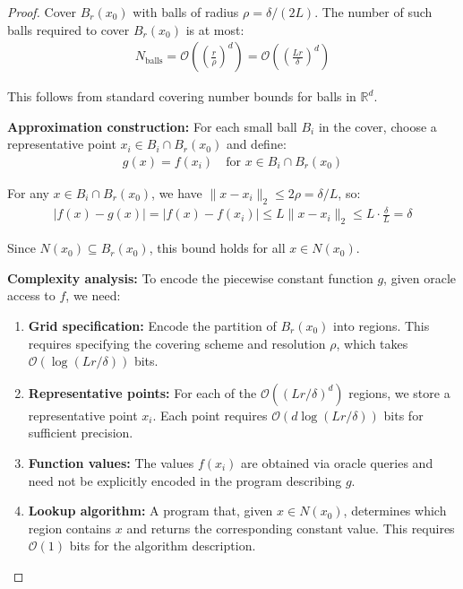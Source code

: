 \documentclass[10pt,a4paper]{amsart}
\begin{document}
\begin{proof}
Cover $B_r(x_0)$ with balls of radius $\rho = \delta/(2L)$. The number of such balls required to cover $B_r(x_0)$ is at most:
\begin{align}
N_{\text{balls}} = \mathcal{O}\left(\left(\frac{r}{\rho}\right)^d\right) = \mathcal{O}\left(\left(\frac{Lr}{\delta}\right)^d\right)
\end{align}

This follows from standard covering number bounds for balls in $\mathbb{R}^d$.

\textbf{Approximation construction:} For each small ball $B_i$ in the cover, choose a representative point $x_i \in B_i \cap B_r(x_0)$ and define:
\begin{align}
g(x) = f(x_i) \quad \text{for } x \in B_i \cap B_r(x_0)
\end{align}

For any $x \in B_i \cap B_r(x_0)$, we have $\|x - x_i\|_2 \leq 2\rho = \delta/L$, so:
\begin{align}
|f(x) - g(x)| = |f(x) - f(x_i)| \leq L\|x - x_i\|_2 \leq L \cdot \frac{\delta}{L} = \delta
\end{align}

Since $N(x_0) \subseteq B_r(x_0)$, this bound holds for all $x \in N(x_0)$.

\textbf{Complexity analysis:} To encode the piecewise constant function $g$, given oracle access to $f$, we need:
\begin{enumerate}
\item \textbf{Grid specification:} Encode the partition of $B_r(x_0)$ into regions. This requires specifying the covering scheme and resolution $\rho$, which takes $\mathcal{O}(\log(Lr/\delta))$ bits.

\item \textbf{Representative points:} For each of the $\mathcal{O}((Lr/\delta)^d)$ regions, we store a representative point $x_i$. Each point requires $\mathcal{O}(d \log(Lr/\delta))$ bits for sufficient precision.

\item \textbf{Function values:} The values $f(x_i)$ are obtained via oracle queries and need not be explicitly encoded in the program describing $g$.

\item \textbf{Lookup algorithm:} A program that, given $x \in N(x_0)$, determines which region contains $x$ and returns the corresponding constant value. This requires $\mathcal{O}(1)$ bits for the algorithm description.
\end{enumerate}


\end{proof}
\end{document}
